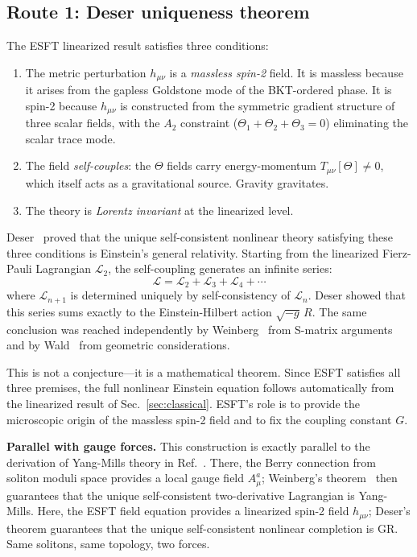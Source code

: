 ﻿\documentclass[twocolumn,preprintnumbers,amsmath,amssymb,prd]{revtex4-2}
\begin{document}
\subsection{Route 1: Deser uniqueness theorem}
\label{sec:deser}

The ESFT linearized result satisfies three conditions:
\begin{enumerate}
\item The metric perturbation $h_{\mu\nu}$ is a \emph{massless spin-2} field. It is massless because it arises from the gapless Goldstone mode of the BKT-ordered phase. It is spin-2 because $h_{\mu\nu}$ is constructed from the symmetric gradient structure of three scalar fields, with the $A_2$ constraint ($\Theta_1 + \Theta_2 + \Theta_3 = 0$) eliminating the scalar trace mode.
\item The field \emph{self-couples}: the $\Theta$ fields carry energy-momentum $T_{\mu\nu}[\Theta] \neq 0$, which itself acts as a gravitational source. Gravity gravitates.
\item The theory is \emph{Lorentz invariant} at the linearized level.
\end{enumerate}

Deser~\cite{Deser1970} proved that the unique self-consistent nonlinear theory satisfying these three conditions is Einstein's general relativity. Starting from the linearized Fierz-Pauli Lagrangian $\mathcal{L}_2$, the self-coupling generates an infinite series:
\begin{equation}
\mathcal{L} = \mathcal{L}_2 + \mathcal{L}_3 + \mathcal{L}_4 + \cdots
\end{equation}
where $\mathcal{L}_{n+1}$ is determined uniquely by self-consistency of $\mathcal{L}_n$. Deser showed that this series sums exactly to the Einstein-Hilbert action $\sqrt{-g}\,R$. The same conclusion was reached independently by Weinberg~\cite{Weinberg1964} from S-matrix arguments and by Wald~\cite{Wald1986} from geometric considerations.

This is not a conjecture---it is a mathematical theorem. Since ESFT satisfies all three premises, the full nonlinear Einstein equation follows automatically from the linearized result of Sec.~\ref{sec:classical}. ESFT's role is to provide the microscopic origin of the massless spin-2 field and to fix the coupling constant $G$.

\textbf{Parallel with gauge forces.} This construction is exactly parallel to the derivation of Yang-Mills theory in Ref.~\cite{Paper2}. There, the Berry connection from soliton moduli space provides a local gauge field $A_\mu^a$; Weinberg's theorem~\cite{Weinberg1979} then guarantees that the unique self-consistent two-derivative Lagrangian is Yang-Mills. Here, the ESFT field equation provides a linearized spin-2 field $h_{\mu\nu}$; Deser's theorem guarantees that the unique self-consistent nonlinear completion is GR. Same solitons, same topology, two forces.
\end{document}
